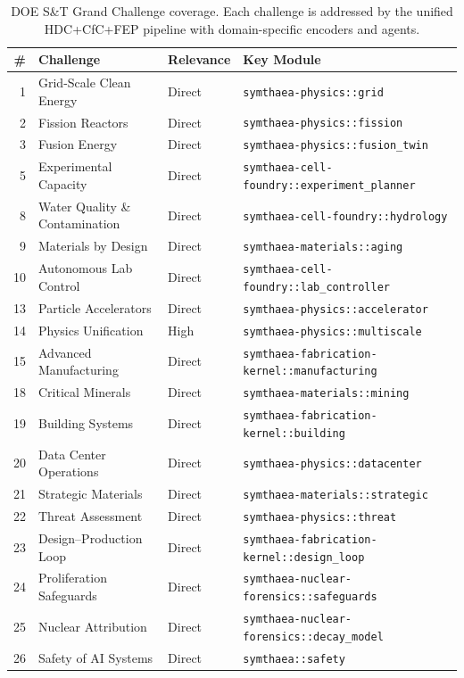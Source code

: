 \documentclass[10pt,letterpaper]{article}
\begin{document}
\begin{table}[t]
\centering
\caption{DOE S\&T Grand Challenge coverage. Each challenge is addressed by the unified HDC+CfC+FEP pipeline with domain-specific encoders and agents.}
\label{tab:doe-challenges}
\small
\begin{tabular}{@{}rlll@{}}
\toprule
\# & Challenge & Relevance & Key Module \\
\midrule
1 & Grid-Scale Clean Energy & Direct & \texttt{symthaea-physics::grid} \\
2 & Fission Reactors & Direct & \texttt{symthaea-physics::fission} \\
3 & Fusion Energy & Direct & \texttt{symthaea-physics::fusion\_twin} \\
5 & Experimental Capacity & Direct & \texttt{symthaea-cell-foundry::experiment\_planner} \\
8 & Water Quality \& Contamination & Direct & \texttt{symthaea-cell-foundry::hydrology} \\
9 & Materials by Design & Direct & \texttt{symthaea-materials::aging} \\
10 & Autonomous Lab Control & Direct & \texttt{symthaea-cell-foundry::lab\_controller} \\
13 & Particle Accelerators & Direct & \texttt{symthaea-physics::accelerator} \\
14 & Physics Unification & High & \texttt{symthaea-physics::multiscale} \\
15 & Advanced Manufacturing & Direct & \texttt{symthaea-fabrication-kernel::manufacturing} \\
18 & Critical Minerals & Direct & \texttt{symthaea-materials::mining} \\
19 & Building Systems & Direct & \texttt{symthaea-fabrication-kernel::building} \\
20 & Data Center Operations & Direct & \texttt{symthaea-physics::datacenter} \\
21 & Strategic Materials & Direct & \texttt{symthaea-materials::strategic} \\
22 & Threat Assessment & Direct & \texttt{symthaea-physics::threat} \\
23 & Design--Production Loop & Direct & \texttt{symthaea-fabrication-kernel::design\_loop} \\
24 & Proliferation Safeguards & Direct & \texttt{symthaea-nuclear-forensics::safeguards} \\
25 & Nuclear Attribution & Direct & \texttt{symthaea-nuclear-forensics::decay\_model} \\
26 & Safety of AI Systems & Direct & \texttt{symthaea::safety} \\
\bottomrule
\end{tabular}
\end{table}
\end{document}
